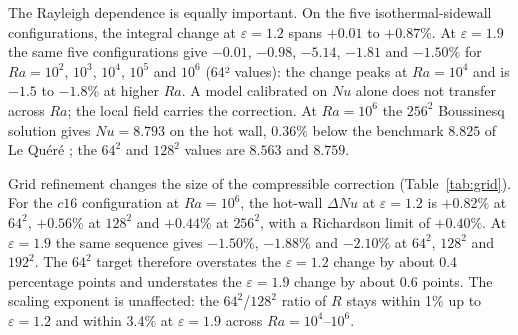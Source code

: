 \documentclass[preprint,11pt,a4paper,times]{elsarticle}
\begin{document}
\begin{table}[htbp]
\centering
\caption{Seed-level means and 95\% confidence intervals for the wall-heat-transfer audits.
Errors are percentages; the interval is a $t$ interval over three seeds for the classical
cavity and five seeds for the random-wall subset.}
\label{tab:seedci}
\small
\setlength{\tabcolsep}{4pt}
\end{table}

The Rayleigh dependence is equally important. On the five isothermal-sidewall
configurations, the integral change at $\varepsilon=1.2$ spans $+0.01$ to $+0.87\%$. At
$\varepsilon=1.9$ the same five configurations give $-0.01$, $-0.98$, $-5.14$, $-1.81$ and
$-1.50\%$ for $Ra=10^2$, $10^3$, $10^4$, $10^5$ and $10^6$ (64² values): the change peaks at
$Ra=10^4$ and is $-1.5$ to $-1.8\%$ at higher $Ra$. A model calibrated on $Nu$ alone does not
transfer across $Ra$; the local field carries the correction. At $Ra=10^6$ the $256^2$
Boussinesq solution gives $Nu=8.793$ on the hot wall, $0.36\%$ below the benchmark $8.825$ of
Le Qu\'er\'e \citep{lequere1991}; the $64^2$ and $128^2$ values are $8.563$ and $8.759$.

Grid refinement changes the size of the compressible correction (Table~\ref{tab:grid}). For the
$c16$ configuration at $Ra=10^6$, the hot-wall $\Delta Nu$ at $\varepsilon=1.2$ is $+0.82\%$ at
$64^2$, $+0.56\%$ at $128^2$ and $+0.44\%$ at $256^2$, with a Richardson limit of $+0.40\%$. At
$\varepsilon=1.9$ the same sequence gives $-1.50\%$, $-1.88\%$ and $-2.10\%$ at $64^2$, $128^2$
and $192^2$. The $64^2$ target
therefore overstates the $\varepsilon=1.2$ change by about 0.4 percentage points and understates
the $\varepsilon=1.9$ change by about 0.6 points. The scaling exponent is unaffected: the
$64^2$/$128^2$ ratio of $R$ stays within 1\% up to $\varepsilon=1.2$ and within 3.4\% at
$\varepsilon=1.9$ across $Ra=10^4$--$10^6$.
\end{document}
